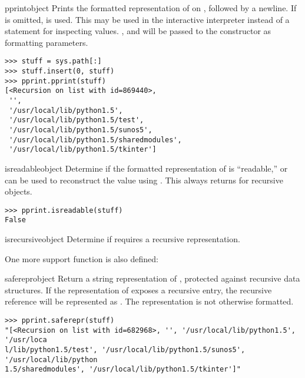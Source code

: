 \begin{funcdesc}{pprint}{object}
Prints the formatted representation of  on ,
followed by a newline.  If  is omitted, 
is used.  This may be used in the interactive interpreter instead of a
 statement for inspecting values.    ,
 and  will be passed to the 
constructor as formatting parameters.

\begin{verbatim}
>>> stuff = sys.path[:]
>>> stuff.insert(0, stuff)
>>> pprint.pprint(stuff)
[<Recursion on list with id=869440>,
 '',
 '/usr/local/lib/python1.5',
 '/usr/local/lib/python1.5/test',
 '/usr/local/lib/python1.5/sunos5',
 '/usr/local/lib/python1.5/sharedmodules',
 '/usr/local/lib/python1.5/tkinter']
\end{verbatim}
\end{funcdesc}

\begin{funcdesc}{isreadable}{object}
Determine if the formatted representation of  is
``readable,'' or can be used to reconstruct the value using
.  This always returns  for
recursive objects.

\begin{verbatim}
>>> pprint.isreadable(stuff)
False
\end{verbatim}
\end{funcdesc}

\begin{funcdesc}{isrecursive}{object}
Determine if  requires a recursive representation.
\end{funcdesc}


One more support function is also defined:

\begin{funcdesc}{saferepr}{object}
Return a string representation of , protected against
recursive data structures.  If the representation of 
exposes a recursive entry, the recursive reference will be represented
as .  The
representation is not otherwise formatted.
\end{funcdesc}

\begin{verbatim}
>>> pprint.saferepr(stuff)
"[<Recursion on list with id=682968>, '', '/usr/local/lib/python1.5', '/usr/loca
l/lib/python1.5/test', '/usr/local/lib/python1.5/sunos5', '/usr/local/lib/python
1.5/sharedmodules', '/usr/local/lib/python1.5/tkinter']"
\end{verbatim}



